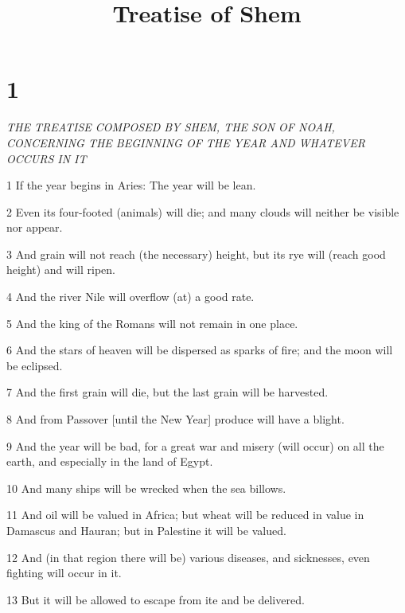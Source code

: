 

\title{Treatise of Shem}

\chapter{1}

\par \textit{THE TREATISE COMPOSED BY SHEM, THE SON OF NOAH, CONCERNING THE BEGINNING OF THE YEAR AND WHATEVER OCCURS IN IT}


\par 1 If the year begins in Aries: The year will be lean. 

\par 2 Even its four-footed (animals) will die; and many clouds will neither be visible nor appear. 

\par 3 And grain will not reach (the necessary) height, but its rye will (reach good height) and will ripen. 

\par 4 And the river Nile will overflow (at) a good rate. 

\par 5 And the king of the Romans will not remain in one place. 

\par 6 And the stars of heaven will be dispersed as sparks of fire; and the moon will be eclipsed. 

\par 7 And the first grain will die, but the last grain will be harvested. 

\par 8 And from Passover [until the New Year] produce will have a blight. 

\par 9 And the year will be bad, for a great war and misery (will occur) on all the earth, and especially in the land of Egypt. 

\par 10 And many ships will be wrecked when the sea billows. 

\par 11 And oil will be valued in Africa; but wheat will be reduced in value in Damascus and Hauran; but in Palestine it will be valued. 

\par 12 And (in that region there will be) various diseases, and sicknesses, even fighting will occur in it. 

\par 13 But it will be allowed to escape from ite and be delivered. 

